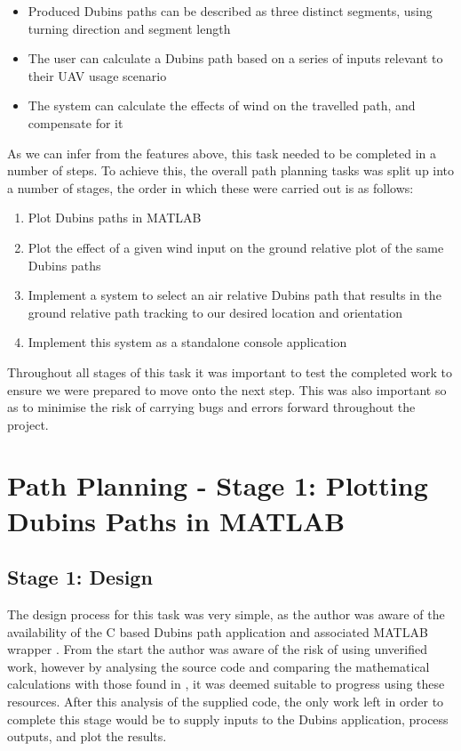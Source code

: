 \begin{itemize}
	\item Produced Dubins paths can be described as three distinct segments, using turning direction and segment length
	\item The user can calculate a Dubins path based on a series of inputs relevant to their UAV usage scenario
	\item The system can calculate the effects of wind on the travelled path, and compensate for it
\end{itemize}


As we can infer from the features above, this task needed to be completed in a number of steps. To achieve this, the overall path planning tasks was split up into a number of stages, the order in which these were carried out is as follows:

\begin{enumerate}
	\item Plot Dubins paths in MATLAB
	\item Plot the effect of a given wind input on the ground relative plot of the same Dubins paths
	\item Implement a system to select an air relative Dubins path that results in the ground relative path tracking to our desired location and orientation
	\item Implement this system as a standalone console application
\end{enumerate}


Throughout all stages of this task it was important to test the completed work to ensure we were prepared to move onto the next step. This was also important so as to minimise the risk of carrying bugs and errors forward throughout the project. 

\section{Path Planning - Stage 1: Plotting Dubins Paths in MATLAB}
\label{task1:stage1}

\subsection{Stage 1: Design}
\label{task1:stage1:design}


The design process for this task was very simple, as the author was aware of the availability of the C based Dubins path application and associated MATLAB wrapper \cite{WalkerDubinsCurves,MexDubinsCurves}. From the start the author was aware of the risk of using unverified work, however by analysing the source code and comparing the mathematical calculations with those found in \cite{shkel2001classification}, it was deemed suitable to progress using these resources. After this analysis of the supplied code, the only work left in order to complete this stage would be to supply inputs to the Dubins application, process outputs, and plot the results.


